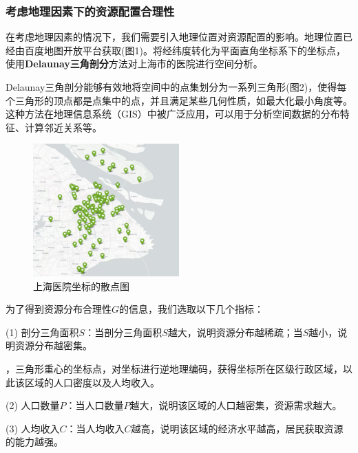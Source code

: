 \documentclass[12pt,a4paper]{article}
\begin{document}
\subsubsection{考虑地理因素下的资源配置合理性}

在考虑地理因素的情况下，我们需要引入地理位置对资源配置的影响。地理位置已经由百度地图开放平台获取(图1)。将经纬度转化为平面直角坐标系下的坐标点，使用\textbf{Delaunay三角剖分}\cite{02}方法对上海市的医院进行空间分析。

Delaunay三角剖分能够有效地将空间中的点集划分为一系列三角形(图2)，使得每个三角形的顶点都是点集中的点，并且满足某些几何性质，如最大化最小角度等。这种方法在地理信息系统（GIS）中被广泛应用，可以用于分析空间数据的分布特征、计算邻近关系等。

\begin{figure}[H] %
\centering %
\includegraphics[width=0.5\textwidth]{images/shanghai_hospital_location.jpg} %
\caption{上海医院坐标的散点图} %
\label{Fig.main2} %
\end{figure}

为了得到资源分布合理性$G$的信息，我们选取以下几个指标：

(1) 剖分三角面积$S$：当剖分三角面积$S$越大，说明资源分布越稀疏；当$S$越小，说明资源分布越密集。

，三角形重心的坐标点，对坐标进行逆地理编码，获得坐标所在区级行政区域，以此该区域的人口密度以及人均收入。
\normalfont

(2) 人口数量$P$：当人口数量$P$越大，说明该区域的人口越密集，资源需求越大。

(3) 人均收入$C$：当人均收入$C$越高，说明该区域的经济水平越高，居民获取资源的能力越强。
\end{document}
